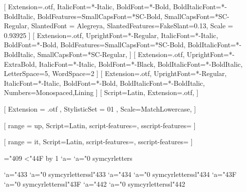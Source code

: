 
% 
%


\setmainfont{Alegreya}[
  Extension=.otf,
  ItalicFont=*-Italic,
  BoldFont=*-Bold,
  BoldItalicFont=*-BoldItalic,
  BoldFeatures={SmallCapsFont=*SC-Bold},
  SmallCapsFont=*SC-Regular,
  SlantedFont = Alegreya,
  SlantedFeatures={FakeSlant=0.13},
  Scale = 0.93925
]
\setsansfont{AlegreyaSans}[
  Extension=.otf,
  UprightFont=*-Regular,
  ItalicFont=*-Italic,
  BoldFont=*-Bold,
  BoldFeatures={SmallCapsFont=*SC-Bold},
  BoldItalicFont=*-BoldItalic,
  SmallCapsFont=*SC-Regular,
]
[
  Extension=.otf,
  UprightFont=*-ExtraBold,
  ItalicFont=*-Italic,
  BoldFont=*-Black,
  BoldItalicFont=*-BoldItalic,
  LetterSpace=5,
  WordSpace=2
]
[
  Extension=.otf,
  UprightFont=*-Regular,
  ItalicFont=*-Italic,
  BoldFont=*-Bold,
  BoldItalicFont=*-BoldItalic,
  Numbers={Monospaced,Lining}
]
[
  Script=Latin,
  Extension=.otf,
]

% 
%

\usepackage{unicode-math}

[%
  Extension = .otf ,
  StylisticSet = 01 ,
  Scale=MatchLowercase,
]

[%
  range = {up},
  Script=Latin,
  script-features={},
  sscript-features={}
]

[%
  range = {it},
  Script=Latin,
  script-features={},
  sscript-features={}
]

\newcommand{\makecyrmathletter}[1]{%
  \begingroup\lccode`a=#1\lowercase{\endgroup
  \Umathcode`a}="0 \csname symcyrletters\endcsname\space #1
}
="409
\loop\ifnum{}<"44F
  \advance{} by 1
  \makecyrmathletter{\count255}
\repeat


\newcommand{\makecyrmathlettersl}[1]{%
  \begingroup\lccode`a=#1\lowercase{\endgroup
  \Umathcode`a}="0 \csname symcyrletterssl\endcsname\space #1
}
\makecyrmathlettersl{"433} %
\makecyrmathlettersl{"434} %
\makecyrmathlettersl{"43F} %
\makecyrmathlettersl{"442} %
